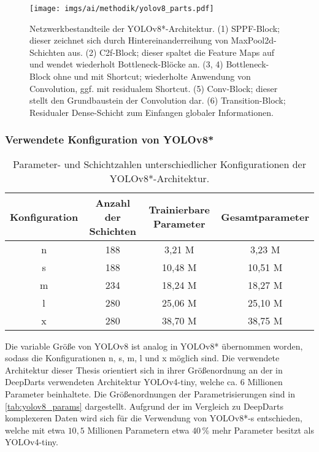 \begin{figure}
    \centering
    \texttt{[image: imgs/ai/methodik/yolov8\_parts.pdf]}
    \caption{Netzwerkbestandteile der YOLOv8*-Architektur. (1) SPPF-Block; dieser zeichnet sich durch Hintereinanderreihung von MaxPool2d-Schichten aus. (2) C2f-Block; dieser spaltet die Feature Maps auf und wendet wiederholt Bottleneck-Blöcke an. (3, 4) Bottleneck-Block ohne und mit Shortcut; wiederholte Anwendung von Convolution, ggf. mit residualem Shortcut. (5) Conv-Block; dieser stellt den Grundbaustein der Convolution dar. (6) Transition-Block; Residualer Dense-Schicht zum Einfangen globaler Informationen.}
    \label{img:yolov8_parts}
\end{figure}

\vspace*{-0.1cm}
\subsubsection{Verwendete Konfiguration von YOLOv8*}
\label{sec:yolov8_konfiguration}

\begin{table}[t]
    \begin{tabular}{c||c|c|c}
        Konfiguration & Anzahl der Schichten & Trainierbare Parameter & Gesamtparameter \\ \hline
        n             & 188                  & 3,21 M                 & 3,23 M          \\
        s             & 188                  & 10,48 M                & 10,51 M         \\
        m             & 234                  & 18,24 M                & 18,27 M         \\
        l             & 280                  & 25,06 M                & 25,10 M         \\
        x             & 280                  & 38,70 M                & 38,75 M
    \end{tabular}
    \caption{Parameter- und Schichtzahlen unterschiedlicher Konfigurationen der YOLOv8*-Architektur.}
    \label{tab:yolov8_params}
\end{table}

Die variable Größe von YOLOv8 ist analog in YOLOv8* übernommen worden, sodass die Konfigurationen n, s, m, l und x möglich sind. Die verwendete Architektur dieser Thesis orientiert sich in ihrer Größenordnung an der in DeepDarts verwendeten Architektur YOLOv4-tiny, welche ca. $6$ Millionen Parameter beinhaltete. Die Größenordnungen der Parametrisierungen sind in \autoref{tab:yolov8_params} dargestellt. Aufgrund der im Vergleich zu DeepDarts komplexeren Daten wird sich für die Verwendung von YOLOv8*-s entschieden, welche mit etwa $10,5$ Millionen Parametern etwa $40\,\%$ mehr Parameter besitzt als YOLOv4-tiny.

